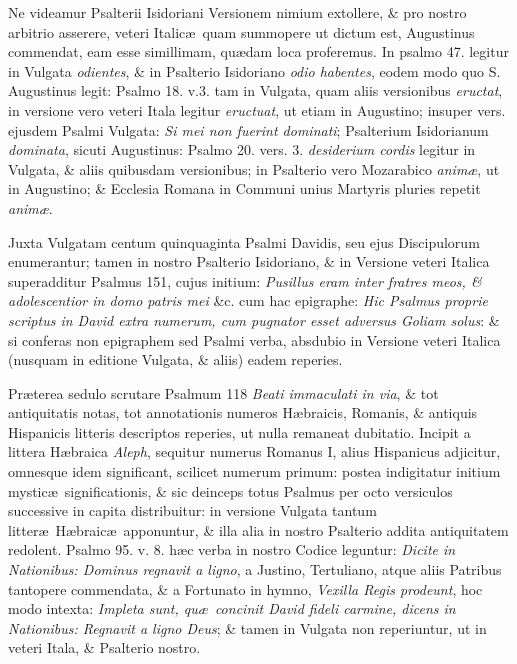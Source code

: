 \documentclass[letter,11pt]{book}
\def\leftmarginnote{%
	\lrmarginnote{\hskip -\marginparsep \hskip -12.25em}}
\begin{document}
\par Ne\leftmarginnote{\begin{flushright}Psalterium Isidori-\\anum lectioni S.\\Augustini ut in\\plurimum congruit.\end{flushright}} videamur Psalterii Isidoriani Versionem nimium extollere, \& pro nostro arbitrio asserere, veteri Italic\ae \ quam summopere ut dictum est, Augustinus commendat, eam esse simillimam, qu\ae dam loca proferemus.
In psalmo 47. legitur in Vulgata {\itshape odientes}, \& in Psalterio Isidoriano {\itshape odio habentes}, eodem modo quo S. Augustinus legit: Psalmo 18. v.3. tam in Vulgata, quam aliis versionibus {\itshape eructat}, in versione vero veteri Itala legitur {\itshape eructuat}, ut etiam in Augustino; insuper vers. ejusdem Psalmi Vulgata: {\itshape Si mei non fuerint dominati}; Psalterium Isidorianum {\itshape dominata}, sicuti Augustinus: Psalmo 20. vers. 3. {\itshape desiderium cordis} legitur in Vulgata, \& aliis quibusdam versionibus; in Psalterio vero Mozarabico {\itshape anim\ae }, ut in Augustino; \& Ecclesia Romana in Communi unius Martyris pluries repetit {\itshape anim\ae }.
\par Juxta Vulgatam centum quinquaginta Psalmi Davidis, seu ejus Discipulorum enumerantur; tamen in nostro Psalterio Isidoriano, \& in Versione veteri Italica superadditur Psalmus 151, cujus initium: {\itshape Pusillus eram inter fratres meos, \& adolescentior in domo patris mei} \&c. cum hac epigraphe: {\itshape Hic Psalmus proprie scriptus in David extra numerum, cum pugnator esset adversus Goliam solus}: \& si conferas non epigraphem sed Psalmi verba, absdubio in Versione veteri Italica
(nusquam in editione Vulgata, \& aliis) eadem reperies.
\par Pr\ae terea sedulo scrutare Psalmum 118 {\itshape Beati immaculati in via}, \& tot antiquitatis notas, tot annotationis numeros H\ae braicis, Romanis, \& antiquis Hispanicis litteris descriptos reperies, ut nulla remaneat dubitatio.
Incipit a littera H\ae braica {\itshape Aleph}, sequitur numerus Romanus I, alius Hispanicus adjicitur, omnesque idem significant, scilicet numerum primum: postea indigitatur initium mystic\ae \ significationis, \& sic deinceps totus Psalmus per octo versiculos successive in capita distribuitur: in versione Vulgata tantum litter\ae \ H\ae braic\ae \ apponuntur, \& illa alia in nostro Psalterio addita antiquitatem redolent.
Psalmo 95. v. 8. h\ae c verba in nostro Codice leguntur: {\itshape Dicite in Nationibus: Dominus regnavit a ligno}, a Justino, Tertuliano, atque aliis Patribus tantopere commendata, \& a Fortunato in hymno, {\itshape Vexilla Regis prodeunt}, hoc modo intexta: {\itshape Impleta sunt, qu\ae \ concinit David fideli carmine, dicens in Nationibus: Regnavit a ligno Deus}; \& tamen in Vulgata non reperiuntur, ut in veteri Itala, \& Psalterio nostro.
\end{document}
